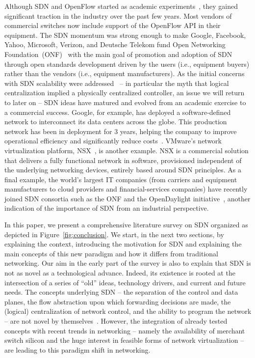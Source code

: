 Although SDN and OpenFlow started as academic
experiments~\cite{mckeown2008}, they gained significant traction in the
industry over the past few years.  Most vendors of commercial switches
now include support of the OpenFlow API in their equipment. The SDN momentum 
was strong enough to make Google, Facebook, Yahoo, Microsoft, Verizon, and Deutsche Telekom fund Open Networking Foundation~(ONF)~\cite{onf2013-3} with the main
goal of promotion and adoption of SDN through open standards development driven by the users (i.e., equipment buyers) rather than the vendors (i.e., equipment manufacturers). 
  As the initial concerns with SDN scalability were addressed~\cite{yeganeh2013}
-- in particular the myth that logical centralization implied a
physically centralized controller, an issue we will return to later on
-- SDN ideas have matured and evolved from an academic exercise to
a commercial success. Google, for example, has deployed a software-defined
network to interconnect its data centers across the globe. This production 
network has been in deployment for 3 years, helping the company to improve 
operational efficiency and significantly reduce costs~\cite{jain2013-1}.
VMware's network virtualization platform, NSX~\cite{vmware2013},
is another example.  NSX is a commercial solution that delivers a
fully functional network in software, provisioned independent of the
underlying networking devices, entirely based around SDN principles.  As
a final example, the world's largest IT companies (from carriers and
equipment manufacturers to cloud providers and financial-services
companies) have recently joined SDN consortia such as the ONF  and the OpenDaylight initiative~\cite{opendaylight2013}, 
another indication of the importance of SDN from an industrial perspective.

In this paper, we present a comprehensive literature survey on SDN organized as depicted in Figure~\ref{fig:conclusion}.  We start, in the next two sections, by explaining the context,
introducing the motivation for SDN and explaining the main concepts
of this new paradigm and how it differs from traditional networking.
Our aim in the early part of the survey is also to explain that SDN 
is not as novel as a technological advance.  Indeed, its existence 
is rooted at the intersection of a series of ``old'' ideas, 
technology drivers, and current and future needs. The concepts underlying SDN -- the 
separation of the control and data planes, the  flow abstraction upon
which forwarding decisions are made, the (logical) centralization of
network control, and the ability 
to program the network -- are not novel by themselves~\cite{feamster2013-2}.
However, the integration of already tested concepts with recent trends 
in networking -- namely the availability of merchant switch silicon and
the huge interest in feasible forms of network virtualization -- are
leading to this paradigm shift in networking.

